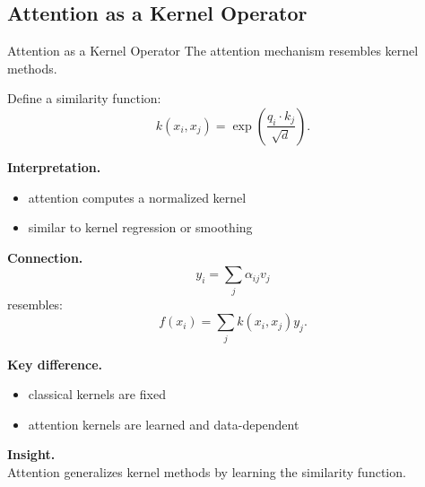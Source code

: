 \documentclass[aspectratio=169,11pt]{beamer}
\begin{document}
\subsection{Attention as a Kernel Operator}
\begin{frame}[t,allowframebreaks]{Attention as a Kernel Operator}
\small
The attention mechanism resembles kernel methods.

Define a similarity function:
\[
k(x_i, x_j) = \exp\left( \frac{q_i \cdot k_j}{\sqrt{d}} \right).
\]

\textbf{Interpretation.}\\ \begin{itemize}
    \item attention computes a normalized kernel
    \item similar to kernel regression or smoothing
\end{itemize}

\textbf{Connection.}\\ \[
y_i = \sum_j \alpha_{ij} v_j
\]
resembles:
\[
f(x_i) = \sum_j k(x_i, x_j) y_j.
\]

\textbf{Key difference.}\\ \begin{itemize}
    \item classical kernels are fixed
    \item attention kernels are learned and data-dependent
\end{itemize}

\textbf{Insight.}\\ Attention generalizes kernel methods by learning the similarity function.
\end{frame}
\end{document}
